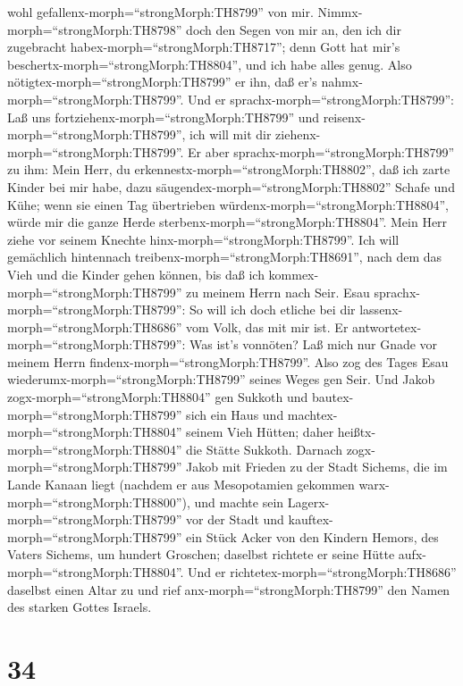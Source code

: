 wohl gefallenx-morph=``strongMorph:TH8799'' von mir. 
Nimmx-morph=``strongMorph:TH8798'' doch den Segen von mir an, den ich
dir zugebracht habex-morph=``strongMorph:TH8717''; denn Gott hat mir's
beschertx-morph=``strongMorph:TH8804'', und ich habe alles genug. Also
nötigtex-morph=``strongMorph:TH8799'' er ihn, daß er's
nahmx-morph=``strongMorph:TH8799''.  Und er
sprachx-morph=``strongMorph:TH8799'': Laß uns
fortziehenx-morph=``strongMorph:TH8799'' und
reisenx-morph=``strongMorph:TH8799'', ich will mit dir
ziehenx-morph=``strongMorph:TH8799''.  Er aber
sprachx-morph=``strongMorph:TH8799'' zu ihm: Mein Herr, du
erkennestx-morph=``strongMorph:TH8802'', daß ich zarte Kinder bei mir
habe, dazu säugendex-morph=``strongMorph:TH8802'' Schafe und Kühe; wenn
sie einen Tag übertrieben würdenx-morph=``strongMorph:TH8804'', würde
mir die ganze Herde sterbenx-morph=``strongMorph:TH8804''. 
Mein Herr ziehe vor seinem Knechte hinx-morph=``strongMorph:TH8799''.
Ich will gemächlich hintennach treibenx-morph=``strongMorph:TH8691'',
nach dem das Vieh und die Kinder gehen können, bis daß ich
kommex-morph=``strongMorph:TH8799'' zu meinem Herrn nach Seir.
 Esau sprachx-morph=``strongMorph:TH8799'': So will ich
doch etliche bei dir lassenx-morph=``strongMorph:TH8686'' vom Volk, das
mit mir ist. Er antwortetex-morph=``strongMorph:TH8799'': Was ist's
vonnöten? Laß mich nur Gnade vor meinem Herrn
findenx-morph=``strongMorph:TH8799''.  Also zog des Tages
Esau wiederumx-morph=``strongMorph:TH8799'' seines Weges gen Seir.
 Und Jakob zogx-morph=``strongMorph:TH8804'' gen Sukkoth
und bautex-morph=``strongMorph:TH8799'' sich ein Haus und
machtex-morph=``strongMorph:TH8804'' seinem Vieh Hütten; daher
heißtx-morph=``strongMorph:TH8804'' die Stätte Sukkoth. 
Darnach zogx-morph=``strongMorph:TH8799'' Jakob mit Frieden zu der Stadt
Sichems, die im Lande Kanaan liegt (nachdem er aus Mesopotamien gekommen
warx-morph=``strongMorph:TH8800''), und machte sein
Lagerx-morph=``strongMorph:TH8799'' vor der Stadt  und
kauftex-morph=``strongMorph:TH8799'' ein Stück Acker von den Kindern
Hemors, des Vaters Sichems, um hundert Groschen; daselbst richtete er
seine Hütte aufx-morph=``strongMorph:TH8804''.  Und er
richtetex-morph=``strongMorph:TH8686'' daselbst einen Altar zu und rief
anx-morph=``strongMorph:TH8799'' den Namen des starken Gottes Israels.

\hypertarget{section-33}{%
\section{34}\label{section-33}}

